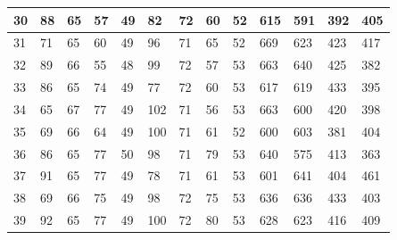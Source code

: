 \documentclass[legalpaper,12pt]{article}
\begin{document}
\begin{table}[htbp]
\begin{tabular}{|l|l|l|l|l|l|l|l|l|l|l|l|l|}
30                                        & 88         & 65        & 57          & 49         & 82         & 72        & 60          & 52         & 615        & 591       & 392         & 405        \\ \hline
31                                        & 71         & 65        & 60          & 49         & 96         & 71        & 65          & 52         & 669        & 623       & 423         & 417        \\ \hline
32                                        & 89         & 66        & 55          & 48         & 99         & 72        & 57          & 53         & 663        & 640       & 425         & 382        \\ \hline
33                                        & 86         & 65        & 74          & 49         & 77         & 72        & 60          & 53         & 617        & 619       & 433         & 395        \\ \hline
34                                        & 65         & 67        & 77          & 49         & 102        & 71        & 56          & 53         & 663        & 600       & 420         & 398        \\ \hline
35                                        & 69         & 66        & 64          & 49         & 100        & 71        & 61          & 52         & 600        & 603       & 381         & 404        \\ \hline
36                                        & 86         & 65        & 77          & 50         & 98         & 71        & 79          & 53         & 640        & 575       & 413         & 363        \\ \hline
37                                        & 91         & 65        & 77          & 49         & 78         & 71        & 61          & 53         & 601        & 641       & 404         & 461        \\ \hline
38                                        & 69         & 66        & 75          & 49         & 98         & 72        & 75          & 53         & 636        & 636       & 433         & 403        \\ \hline
39                                        & 92         & 65        & 77          & 49         & 100        & 72        & 80          & 53         & 628        & 623       & 416         & 409        
\end{tabular}
\end{table}
\end{document}
